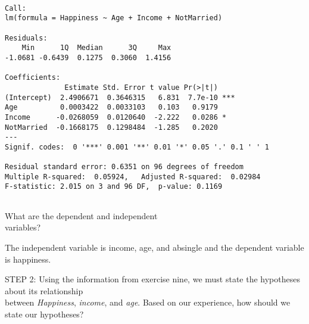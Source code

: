 \documentclass[11pt]{book}\usepackage[]{graphicx}\usepackage[]{color}
\begin{document}
\begin{exercises}
\begin{exercise}
{{}}

{\tiny{
  \begin{verbatim}

Call:
lm(formula = Happiness ~ Age + Income + NotMarried)

Residuals:
    Min      1Q  Median      3Q     Max 
-1.0681 -0.6439  0.1275  0.3060  1.4156 

Coefficients:
              Estimate Std. Error t value Pr(>|t|)    
(Intercept)  2.4906671  0.3646315   6.831  7.7e-10 ***
Age          0.0003422  0.0033103   0.103   0.9179    
Income      -0.0268059  0.0120640  -2.222   0.0286 *  
NotMarried  -0.1668175  0.1298484  -1.285   0.2020    
---
Signif. codes:  0 '***' 0.001 '**' 0.01 '*' 0.05 '.' 0.1 ' ' 1

Residual standard error: 0.6351 on 96 degrees of freedom
Multiple R-squared:  0.05924,	Adjusted R-squared:  0.02984 
F-statistic: 2.015 on 3 and 96 DF,  p-value: 0.1169


  \end{verbatim}
}}

What are the dependent and independent \\ variables?

    \vspace{5mm}

    \end{exercise}
    \vspace{2mm}
    \begin{solution}      %

       The independent variable is income,   age, and absingle and the dependent variable is happiness.

    \end{solution}

  \begin{exercise} %

    STEP 2: Using the information from exercise nine, we must state the hypotheses about its relationship \\ between  {\textit{Happiness}}, {\textit{income}}, and {\textit{age}}.  Based on our experience, how should we state our hypotheses?

    \vspace{5mm}

    \end{exercise}
    \vspace{2mm}
    \begin{solution}      %


\end{solution}
\end{exercises}
\end{document}
